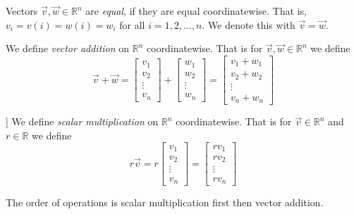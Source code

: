 \begin{definition}
Vectors $\vec{v}, \vec{w} \in \mathbb{R}^n$ are \emph{equal},  if they are equal 
coordinatewise. That is, $v_i=v(i)=w(i)=w_i$ for all $i=1,2,\ldots, n$. We 
denote this with  $\vec{v}=\vec{w}$.
\end{definition}


\begin{definition}
We define \emph{vector addition} on $\mathbb{R}^n$ coordinatewise. That is for 
$\vec{v},\vec{w} \in \mathbb{R}^n$ we define
\[
\vec{v}+\vec{w}=
\begin{bmatrix}v_1\\ v_2 \\ \vdots \\ v_n\end{bmatrix}+
\begin{bmatrix}w_1\\ w_2 \\ \vdots \\ w_n\end{bmatrix}=
\begin{bmatrix}v_1+w_1\\ v_2+w_2 \\ \vdots \\ v_n+w_n\end{bmatrix}
\]
\end{definition}

\begin{definition}]
We define \emph{scalar multiplication} on $\mathbb{R}^n$ coordinatewise. That 
is for $\vec{v} \in \mathbb{R}^n$ and $r \in \mathbb{R}$ we define
\[
r\vec{v}=
r\begin{bmatrix}v_1\\ v_2 \\ \vdots \\ v_n\end{bmatrix}=
\begin{bmatrix}rv_1\\ rv_2 \\ \vdots \\ rv_n\end{bmatrix}
\]
\end{definition}

The order of operations is scalar multiplication first then vector addition.

